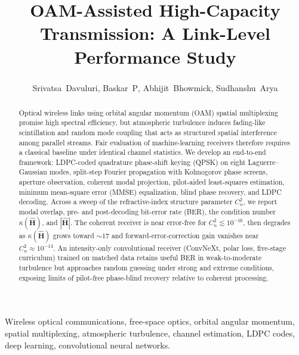 \documentclass[journal]{IEEEtran}
\begin{document}
\title{OAM-Assisted High-Capacity Transmission: A Link-Level Performance Study}

\author{Srivatsa~Davuluri\textsuperscript{},
        Baskar~P\textsuperscript{},
        Abhijit~Bhowmick\textsuperscript{},
        Sudhanshu~Arya\textsuperscript{}%

}

\maketitle
{}


\begin{abstract}
Optical wireless links using orbital angular momentum (OAM) spatial multiplexing promise high spectral efficiency, but atmospheric turbulence induces fading-like scintillation and random mode coupling that acts as structured spatial interference among parallel streams. Fair evaluation of machine-learning receivers therefore requires a classical baseline under identical channel statistics. We develop an end-to-end framework: LDPC-coded quadrature phase-shift keying (QPSK) on eight Laguerre--Gaussian modes, split-step Fourier propagation with Kolmogorov phase screens, aperture observation, coherent modal projection, pilot-aided least-squares estimation, minimum mean-square error (MMSE) equalization, blind phase recovery, and LDPC decoding. Across a sweep of the refractive-index structure parameter $C_n^2$, we report modal overlap, pre- and post-decoding bit-error rate (BER), the condition number $\kappa(\hat{\mathbf{H}})$, and $|\hat{\mathbf{H}}|$. The coherent receiver is near error-free for $C_n^2 \lesssim 10^{-16}$, then degrades as $\kappa(\hat{\mathbf{H}})$ grows toward $\sim 17$ and forward-error-correction gain vanishes near $C_n^2 \approx 10^{-14}$. An intensity-only convolutional receiver (ConvNeXt, polar loss, five-stage curriculum) trained on matched data retains useful BER in weak-to-moderate turbulence but approaches random guessing under strong and extreme conditions, exposing limits of pilot-free phase-blind recovery relative to coherent processing.
\end{abstract}

\begin{IEEEkeywords}
Wireless optical communications, free-space optics, orbital angular momentum, spatial multiplexing, atmospheric turbulence, channel estimation, LDPC codes, deep learning, convolutional neural networks.
\end{IEEEkeywords}
\end{document}
